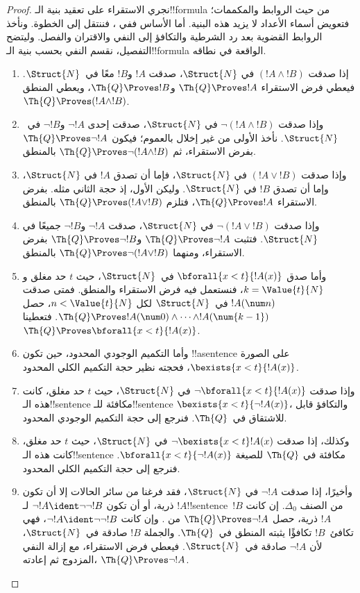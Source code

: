 \documentclass[../../../include/open-logic-section]{subfiles}
\begin{document}
\begin{proof}
نجري الاستقراء على تعقيد بنية الـ!!{formula} من حيث الروابط والمكممات؛
فتعويض أسماء الأعداد لا يزيد هذه البنية.
%
أما الأساس ففي ، فننتقل إلى الخطوة.
ونأخذ الروابط القضوية بعد رد الشرطية والتكافؤ إلى النفي والاقتران والفصل.
وليتضح التفصيل، نقسم النفي بحسب بنية الـ!!{formula} الواقعة في نطاقه.

\begin{enumerate}
\item إذا صدقت $(!A\land !B)$ في $\Struct{N}$، صدقت
$!A$ و$!B$ معًا في~$\Struct{N}$.
فيعطي فرض الاستقراء $\Th{Q}\Proves !A$
و$\Th{Q}\Proves !B$، ويعطي المنطق $\Th{Q}\Proves(!A\land !B)$.
%
\item وإذا صدقت $\lnot(!A\land !B)$ في $\Struct{N}$،
صدقت إحدى $\lnot !A$ و$\lnot !B$ في~$\Struct{N}$.
نأخذ الأولى من غير إخلال بالعموم؛
فيكون $\Th{Q}\Proves\lnot !A$ بفرض الاستقراء،
ثم $\Th{Q}\Proves\lnot(!A\land !B)$ بالمنطق.
%
\item وإذا صدقت $(!A\lor !B)$ في $\Struct{N}$،
فإما أن تصدق $!A$ في $\Struct{N}$، وإما أن تصدق $!B$ في $\Struct{N}$.
وليكن الأول، إذ حجة الثاني مثله.
بفرض الاستقراء $\Th{Q}\Proves !A$،
فتلزم $\Th{Q}\Proves(!A\lor !B)$ بالمنطق.
%
\item وإذا صدقت $\lnot(!A\lor !B)$ في $\Struct{N}$،
صدقت $\lnot !A$ و$\lnot !B$ جميعًا في $\Struct{N}$.
فتثبت $\Th{Q}\Proves\lnot !A$
و$\Th{Q}\Proves\lnot !B$ بفرض الاستقراء،
ومنهما $\Th{Q}\Proves\lnot(!A\lor !B)$ بالمنطق.
%
\item وأما صدق $\bforall{x<t}{!A(x)}$ في~$\Struct{N}$،
حيث $t$ حد مغلق و$k=\Value{t}{N}$، فنستعمل فيه فرض الاستقراء والمنطق.
فمتى صدقت $!A(\num n)$ في~$\Struct{N}$ لكل
$n<\Value{t}{N}$، حصل
$\Th{Q}\Proves !A(\num 0)\land\dots\land !A(\num{k-1})$.
فتعطينا 
$\Th{Q}\Proves\bforall{x<t}{!A(x)}$.
%
\item وأما التكميم الوجودي المحدود، حين تكون !!a{sentence} على الصورة
$\bexists{x<t}{!A(x)}$، فحجته نظير حجة التكميم الكلي المحدود.
%
\item وإذا صدقت $\lnot\bforall{x<t}{!A(x)}$ في
$\Struct{N}$، حيث $t$ حد مغلق، كانت هذه الـ!!{sentence}
مكافئة للـ!!{sentence} $\bexists{x<t}{\lnot !A(x)}$،
والتكافؤ قابل للاشتقاق في~$\Th{Q}$.
فنرجع إلى حجة التكميم الوجودي المحدود.
%
\item وكذلك، إذا صدقت $\lnot\bexists{x<t}!A(x)$ في
$\Struct{N}$، حيث $t$ حد مغلق، كانت هذه الـ!!{sentence} مكافئة في
$\Th{Q}$ للصيغة $\bforall{x<t}{\lnot !A(x)}$.
فنرجع إلى حجة التكميم الكلي المحدود.
%
\item وأخيرًا، إذا صدقت $\lnot !A$ في $\Struct{N}$،
فقد فرغنا من سائر الحالات إلا أن تكون $!A$ ذرية، أو أن تكون
$\lnot !A\ident\lnot\lnot !B$ لـ!!{sentence}~$!B$
من الصنف $\Delta_0$.
إن كانت $!A$ ذرية، حصل $\Th{Q}\Proves\lnot !A$
من .
وإن كانت $\lnot !A\ident\lnot\lnot !B$،
فهي تكافئ~$!B$ تكافؤًا يثبته المنطق في~$\Th{Q}$.
والجملة $!B$ صادقة في~$\Struct{N}$، لأن
$\lnot !A$ صادقة في~$\Struct{N}$.
فيعطي فرض الاستقراء، مع إزالة النفي المزدوج ثم إعادته،
$\Th{Q}\Proves\lnot !A$.
\end{enumerate}
\end{proof}
\end{document}
